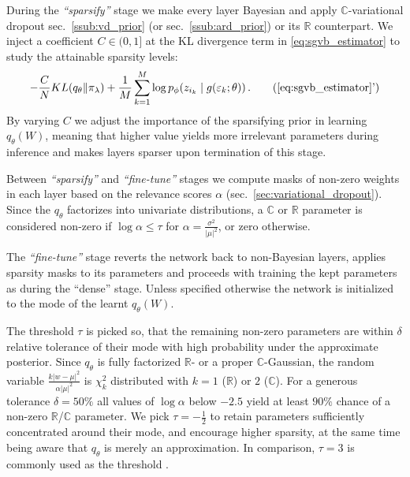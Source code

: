 \documentclass[a4paper,10pt,twocolumn]{article}
\newcommand{\real}{\mathbb{R}}
\newcommand{\cplx}{\mathbb{C}}
\begin{document}
During the \emph{``sparsify''} stage we make every layer Bayesian and apply $\cplx$-variational
dropout sec.~\ref{ssub:vd_prior} (or sec.~\ref{ssub:ard_prior}) or its $\real$ counterpart.
We inject a coefficient $
  C \in (0, 1]
$ at the KL divergence term in \eqref{eq:sgvb_estimator} to study the attainable sparsity levels:
\begin{equation}  \label{eq:elbo_with_coef}
  - \frac{C}N KL(q_{\theta} \| \pi_{\lambda})
  + \frac1{M} \sum_{k=1}^M
      \log p_{\phi}(z_{i_k} \mid g(\varepsilon_k; \theta))
  \,.
  \tag{\ref{eq:sgvb_estimator}'}
\end{equation}
By varying $C$ we adjust the importance of the sparsifying prior in learning $q_\theta(W)$,
meaning that higher value yields more irrelevant parameters during inference and makes
layers sparser upon termination of this stage.

Between \emph{``sparsify''} and \emph{``fine-tune''} stages we compute masks of non-zero
weights in each layer based on the relevance scores $\alpha$ (sec.~\ref{sec:variational_dropout}).
Since the $q_\theta$ factorizes into univariate distributions, a $\cplx$ or $\real$ parameter
is considered non-zero if $\log \alpha \leq \tau$ for $
  \alpha = \tfrac{\sigma^2}{\lvert\mu\rvert^2}
$, or zero otherwise.

The \emph{``fine-tune''} stage reverts the network back to non-Bayesian layers, applies
sparsity masks to its parameters and proceeds with training the kept parameters as during
the ``dense'' stage. Unless specified otherwise the network is initialized to the mode
of the learnt $q_\theta(W)$.

The threshold $\tau$ is picked so, that the remaining non-zero parameters are within
$\delta$ relative tolerance of their mode with high probability under the approximate
posterior. Since $q_\theta$ is fully factorized $\real$- or a proper $\cplx$-Gaussian,
the random variable $
  \tfrac{k \lvert w - \mu \rvert^2}
        {\alpha \lvert \mu \rvert^2}
$ is $\chi^2_k$ distributed with $k=1$ ($\real$) or $2$ ($\cplx$).
%
For a generous tolerance $\delta = 50\%$ all values of $\log \alpha$ below $-2.5$ yield
at least $90\%$ chance of a non-zero $\real$/$\cplx$ parameter. We pick $\tau = -\tfrac12$
to retain parameters sufficiently concentrated around their mode, and encourage higher
sparsity, at the same time being aware that $q_\theta$ is merely an approximation.
In comparison, $\tau = 3$ is commonly used as the threshold
\citep{molchanov_variational_2017,kingma_variational_2015}.
\end{document}
